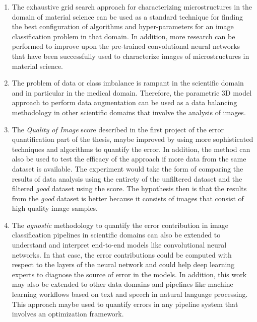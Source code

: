 \begin{enumerate}

\item The exhaustive grid search approach for characterizing microstructures in the domain of material science can be used as a standard technique for finding the best configuration of algorithms and hyper-parameters for an image classification problem in that domain. In addition, more research can be performed to improve upon the pre-trained convolutional neural networks that have been successfully used to characterize images of microstructures in material science.
\item The problem of data or class imbalance is rampant in the scientific domain and in particular in the medical domain. Therefore, the parametric 3D model approach to perform data augmentation can be used as a data balancing methodology in other scientific domains that involve the analysis of images. 
\item The \textit{Quality of Image} score described in the first project of the error quantification part of the thesis, maybe improved by using more sophisticated techniques and algorithms to quantify the error. In addition, the method can also be used to test the efficacy of the approach if more data from the same dataset is available. The experiment would take the form of comparing the results of data analysis using the entirety of the unfiltered dataset and the filtered \textit{good} dataset using the score. The hypothesis then is that the results from the \textit{good} dataset is better because it consists of images that consist of high quality image samples.

\item The \textit{agnostic} methodology to quantify the error contribution in image classification pipelines in scientific domains can also be extended  to understand and interpret end-to-end models like convolutional neural networks. In that case, the error contributions could be computed with respect to the layers of the neural network and could help deep learning experts to diagnose the source of error in the models. In addition, this work may also be extended to other data domains and pipelines like machine learning workflows based on text and speech in natural language processing. This approach maybe used to quantify errors in any pipeline system that involves an optimization framework. 

\end{enumerate}
